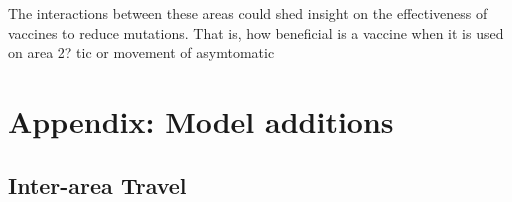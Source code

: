 \documentclass{article}
\begin{document}
The interactions between these areas could shed insight on the effectiveness of vaccines to reduce mutations. That is, how beneficial is a vaccine when it is used on area 2?
tic or  movement of asymtomatic
\newpage

%
%



































\newpage
\section{Appendix: Model additions}

\subsection{Inter-area Travel}\label{appendix:travel}
\end{document}
